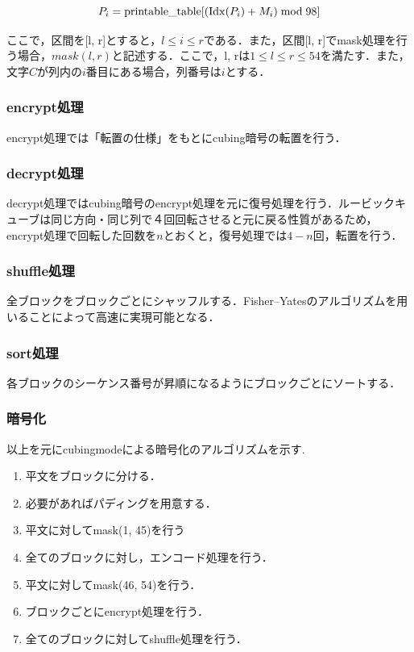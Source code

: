 \documentclass[titlepage]{jarticle}
\begin{document}
\[P_i=\mathrm{printable\_table}[(\mathrm{Idx}(P_i)+M_i) \bmod 98]\\\]

ここで，区間を[l, r]とすると，\(l\leq i \leq r\)である．また，区間[l, r]でmask処理を行う場合，\(mask(l, r)\)と記述する．ここで，l, rは\(1 \leq l \leq r \leq 54\)を満たす．また，文字\(C\)が列内の\(i\)番目にある場合，列番号は\(i\)とする．

\subsubsection{encrypt処理}
encrypt処理では「転置の仕様」をもとにcubing暗号の転置を行う．

\subsubsection{decrypt処理}
decrypt処理ではcubing暗号のencrypt処理を元に復号処理を行う．ルービックキューブは同じ方向・同じ列で４回回転させると元に戻る性質があるため，encrypt処理で回転した回数を\(n\)とおくと，復号処理では\(4-n\)回，転置を行う．

\subsubsection{shuffle処理}
全ブロックをブロックごとにシャッフルする．Fisher–Yatesのアルゴリズムを用いることによって高速に実現可能となる．

\subsubsection{sort処理}
各ブロックのシーケンス番号が昇順になるようにブロックごとにソートする．

\subsubsection{暗号化}
以上を元にcubingmodeによる暗号化のアルゴリズムを示す. 
\begin{enumerate}
\item 平文をブロックに分ける．
\item 必要があればパディングを用意する．
\item 平文に対してmask(1, 45)を行う
\item 全てのブロックに対し，エンコード処理を行う．
\item 平文に対してmask(46, 54)を行う．
\item ブロックごとにencrypt処理を行う．
\item 全てのブロックに対してshuffle処理を行う．
\end{enumerate}
\end{document}
